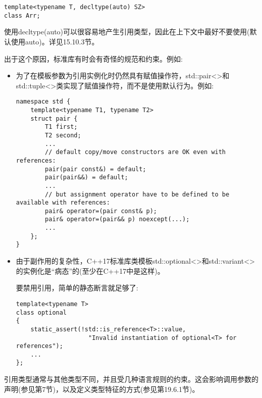 \begin{lstlisting}[style=styleCXX]
template<typename T, decltype(auto) SZ>
class Arr;
\end{lstlisting}

使用decltype(auto)可以很容易地产生引用类型，因此在上下文中最好不要使用(默认使用auto)。详见15.10.3节。

出于这个原因，标准库有时会有奇怪的规范和约束。例如:

\begin{itemize}
\item 
为了在模板参数为引用实例化时仍然具有赋值操作符，std::pair<>和std::tuple<>类实现了赋值操作符，而不是使用默认行为。例如:

\begin{lstlisting}[style=styleCXX]
namespace std {
	template<typename T1, typename T2>
	struct pair {
		T1 first;
		T2 second;
		...
		// default copy/move constructors are OK even with references:
		pair(pair const&) = default;
		pair(pair&&) = default;
		...
		// but assignment operator have to be defined to be available with references:
		pair& operator=(pair const& p);
		pair& operator=(pair&& p) noexcept(...);
		...
	};
}
\end{lstlisting}

\item 
由于副作用的复杂性，C++17标准库类模板std::optional<>和std::variant<>的实例化是“病态”的(至少在C++17中是这样)。

要禁用引用，简单的静态断言就足够了:

\begin{lstlisting}[style=styleCXX]
template<typename T>
class optional
{
	static_assert(!std::is_reference<T>::value,
					"Invalid instantiation of optional<T> for references");
	...
};
\end{lstlisting}

\end{itemize}

引用类型通常与其他类型不同，并且受几种语言规则的约束。这会影响调用参数的声明(参见第7节)，以及定义类型特征的方式(参见第19.6.1节)。















